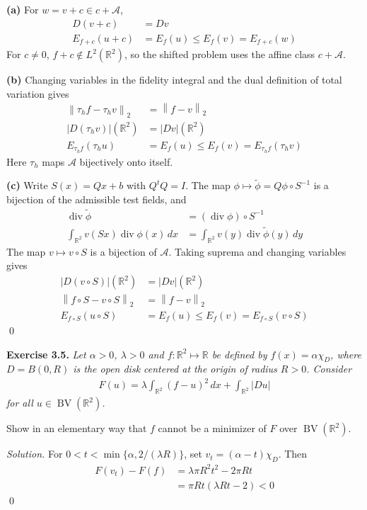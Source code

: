\documentclass[12pt,letterpaper]{article}
\newcommand{\R}{\mathbb R}
\newcommand{\BV}{\operatorname{BV}}
\newcommand{\diver}{\operatorname{div}}
\newcommand{\dx}{\,dx}
\newcommand{\norm}[1]{\left\lVert #1\right\rVert}
\newcommand{\exercise}[1]{%
  \par\bigskip\noindent\textbf{Exercise #1.}\enspace}
\newenvironment{statement}{\itshape\ignorespaces}{\par}
\newcommand{\solution}{\par\medskip\noindent\textit{Solution.}\enspace}
\newcommand{\partlabel}[1]{\par\medskip\noindent\textbf{(#1)}\enspace}
\newcommand{\finish}{\qed\par}
\begin{document}
\partlabel{a}
For $w=v+c\in c+\mathcal A$,
\begin{align*}
 D(v+c)&=Dv\\
 E_{f+c}(u+c)&=E_f(u)\le E_f(v)=E_{f+c}(w)
\end{align*}
For $c\ne0$, $f+c\notin L^2(\R^2)$, so the shifted problem
uses the affine class $c+\mathcal A$.

\partlabel{b}
Changing variables in the fidelity integral and the dual definition
of total variation gives
\begin{align*}
 \norm{\tau_h f-\tau_h v}_2&=\norm{f-v}_2\\
 |D(\tau_h v)|(\R^2)&=|Dv|(\R^2)\\
 E_{\tau_h f}(\tau_h u)&=E_f(u)\le E_f(v)=E_{\tau_h f}(\tau_h v)
\end{align*}
Here $\tau_h$ maps $\mathcal A$ bijectively onto itself.

\partlabel{c}
Write $S(x)=Qx+b$ with $Q^tQ=I$.
The map $\phi\mapsto\widetilde\phi=Q\phi\circ S^{-1}$ is a
bijection of the admissible test fields, and
\begin{align*}
 \diver\widetilde\phi&=(\diver\phi)\circ S^{-1}\\
 \int_{\R^2}v(Sx)\diver\phi(x)\dx
 &=\int_{\R^2}v(y)\diver\widetilde\phi(y)\,dy
\end{align*}
The map $v\mapsto v\circ S$ is a bijection of $\mathcal A$.
Taking suprema and changing variables gives
\begin{align*}
 |D(v\circ S)|(\R^2)&=|Dv|(\R^2)\\
 \norm{f\circ S-v\circ S}_2&=\norm{f-v}_2\\
 E_{f\circ S}(u\circ S)&=E_f(u)\le E_f(v)=E_{f\circ S}(v\circ S)
\end{align*}
\finish

\begin{samepage}
\exercise{3.5}
\begin{statement}
Let $\alpha>0$, $\lambda>0$ and $f:\R^2\mapsto\R$ be defined by
$f(x)=\alpha\chi_D$, where $D=B(0,R)$ is the open disk centered at
the origin of radius $R>0$. Consider
\begin{align*}
 F(u)=\lambda\int_{\R^2}(f-u)^2\dx+\int_{\R^2}|Du|
\end{align*}
for all $u\in\BV(\R^2)$.

Show in an elementary way that $f$ cannot be a minimizer of $F$
over $\BV(\R^2)$.
\end{statement}
\end{samepage}

\solution
For $0<t<\min\{\alpha,2/(\lambda R)\}$, set $v_t=(\alpha-t)\chi_D$.
Then
\begin{align*}
 F(v_t)-F(f)&=\lambda\pi R^2t^2-2\pi Rt\\
 &=\pi Rt(\lambda Rt-2)<0
\end{align*}
\finish
\end{document}

